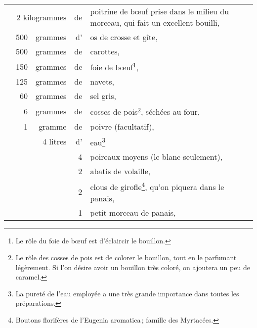 \footnotesize
\setlength\tabcolsep{.15em}
\begin{longtable}{rrrrp{16em}}   
  & \multicolumn{2}{r}{2 kilogrammes} & de & poitrine de bœuf prise dans le milieu 
                                            du morceau, qui fait un excellent bouilli,                    \\
  &   500 & grammes & d' & os de crosse et gîte,                                                          \\
  &   500 & grammes & de & carottes,                                                                      \\
  &   150 & grammes & de & foie de bœuf\footnote{Le rôle du foie de bœuf  est d'éclaircir le bouillon.},  \\
  &   125 & grammes & de & navets,                                                                        \\
  &    60 & grammes & de & sel gris,                                                                      \\
  &     6 & grammes & de & cosses de pois\footnote{Le rôle des cosses
                                               de pois est de colorer le bouillon, tout en le          
                                               parfumant légèrement. Si l'on désire avoir un           
                                               bouillon très coloré, on ajoutera un peu de             
                                               caramel.}, séchées au four,                                \\
  &     1 & gramme  & de & poivre (facultatif),                                                           \\
  &      & 4 litres & d' & eau\footnote{La pureté de l’eau employée a une très grande importance 
                                    dans toutes les préparations.}                                        \\
  &       &         &  4 & poireaux moyens (le blanc seulement),                                          \\
  &       &         &  2 & abatis de volaille,                                                            \\
  &       &         &  2 & clous de girofle\footnote{ Boutons florifères de l'Eugenia aromatica ; 
                                             famille des Myrtacées.}, qu'on piquera dans le panais,       \\
  &       &         &  1 & petit morceau de panais,                                                       \\

\end{longtable}
